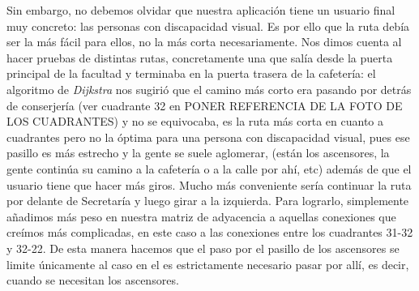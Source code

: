 Sin embargo, no debemos olvidar que nuestra aplicación tiene un usuario final muy concreto: las personas con discapacidad visual. Es por ello que la ruta debía ser la más fácil para ellos, no la más corta necesariamente. Nos dimos cuenta al hacer pruebas de distintas rutas, concretamente una que salía desde la puerta principal de la facultad y terminaba en la puerta trasera de la cafetería: el algoritmo de \textit{Dijkstra} nos sugirió que el camino más corto era pasando por detrás de conserjería (ver cuadrante 32 en PONER REFERENCIA DE LA FOTO DE LOS CUADRANTES) y no se equivocaba, es la ruta más corta en cuanto a cuadrantes pero no la óptima para una persona con discapacidad visual, pues ese pasillo es más estrecho y la gente se suele aglomerar, (están los ascensores, la gente continúa su camino a la cafetería o a la calle por ahí, etc) además de que el usuario tiene que hacer más giros. Mucho más conveniente sería continuar la ruta por delante de Secretaría y luego girar a la izquierda. Para lograrlo, simplemente añadimos más peso en nuestra matriz de adyacencia a aquellas conexiones que creímos más complicadas, en este caso a las conexiones entre los cuadrantes 31-32 y 32-22. De esta manera hacemos que el paso por el pasillo de los ascensores se limite únicamente al caso en el es estrictamente necesario pasar por allí, es decir, cuando se necesitan los ascensores.